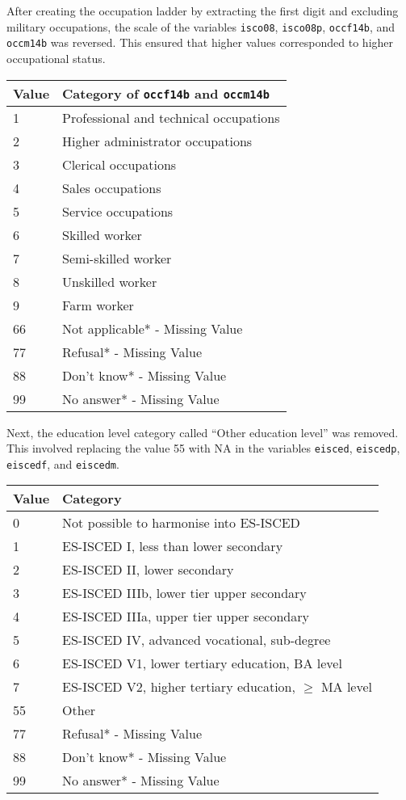 	After creating the occupation ladder by extracting the first digit and excluding military occupations, the scale of the variables \texttt{isco08}, \texttt{isco08p}, \texttt{occf14b}, and \texttt{occm14b} was reversed. This ensured that higher values corresponded to higher occupational status.
	
	\begin{longtable}{ll}
		\toprule
		\textbf{Value} & \textbf{Category of \texttt{occf14b} and \texttt{occm14b}} \\
		\midrule
		1  & Professional and technical occupations \\
		2  & Higher administrator occupations \\
		3  & Clerical occupations \\
		4  & Sales occupations \\
		5  & Service occupations \\
		6  & Skilled worker \\
		7  & Semi-skilled worker \\
		8  & Unskilled worker \\
		9  & Farm worker \\
		66 & Not applicable* - Missing Value \\
		77 & Refusal* - Missing Value \\
		88 & Don't know* - Missing Value \\
		99 & No answer* - Missing Value \\
		\bottomrule
	\end{longtable}
	
	Next, the education level category called “Other education level” was removed. This involved replacing the value 55 with NA in the variables \texttt{eisced}, \texttt{eiscedp}, \texttt{eiscedf}, and \texttt{eiscedm}.
	
	\begin{longtable}{ll}
		\toprule
		\textbf{Value} & \textbf{Category} \\
		\midrule
		0  & Not possible to harmonise into ES-ISCED \\
		1  & ES-ISCED I, less than lower secondary \\
		2  & ES-ISCED II, lower secondary \\
		3  & ES-ISCED IIIb, lower tier upper secondary \\
		4  & ES-ISCED IIIa, upper tier upper secondary \\
		5  & ES-ISCED IV, advanced vocational, sub-degree \\
		6  & ES-ISCED V1, lower tertiary education, BA level \\
		7  & ES-ISCED V2, higher tertiary education, $\geq$ MA level \\
		55 & Other \\
		77 & Refusal* - Missing Value \\
		88 & Don't know* - Missing Value \\
		99 & No answer* - Missing Value \\
		\bottomrule
	\end{longtable}
	
